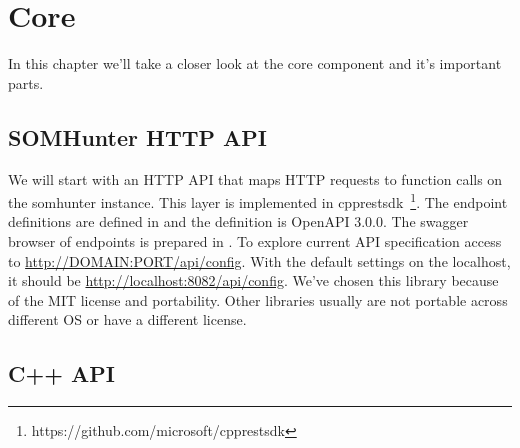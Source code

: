 \chapter{Core}
\label{comp-core}

In this chapter we'll take a closer look at the core component and it's important parts.

\section{SOMHunter HTTP API}

We will start with an HTTP API that maps HTTP requests to function calls on the somhunter instance. This layer is implemented in cpprestsdk~\footnote{https://github.com/microsoft/cpprestsdk}. The endpoint definitions are defined in  and the definition is OpenAPI 3.0.0. The swagger browser of endpoints is prepared in . To explore current API specification access to \url{http://DOMAIN:PORT/api/config}. With the default settings on the localhost, it should be \url{http://localhost:8082/api/config}. We've chosen this library because of the MIT license and portability. Other libraries usually are not portable across different OS or have a different license.

\section{C++ API}

